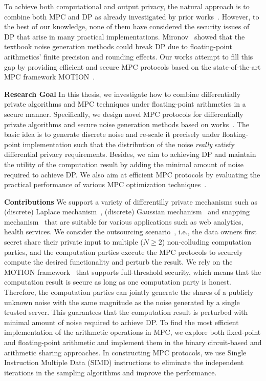 To achieve both computational and output privacy, the natural approach is to combine both MPC and DP as already investigated by prior works~\cite{eigner2014differentially, pettai2015combining, byrd2020differentially}. However, to the best of our knowledge, none of them have considered the security issues of DP that arise in many practical implementations. Mironov~\cite{mironov2012significance} showed that the textbook noise generation methods could break DP due to floating-point arithmetics' finite precision and rounding effects. Our works attempt to fill this gap by providing efficient and secure MPC protocols based on the state-of-the-art MPC framework MOTION~\cite{braun2020motion}.

\textbf{Research Goal}
In this thesis, we investigate how to combine differentially private algorithms and MPC techniques under floating-point arithmetics in a secure manner. Specifically, we design novel MPC protocols for differentially private algorithms and secure noise generation methods based on works~\cite{mironov2012significance,googleDP2019,canonne2020discrete}. The basic idea is to generate discrete noise and re-scale it precisely under floating-point implementation such that the distribution of the noise \textit{really} satisfy differential privacy requirements. Besides, we aim to achieving DP and maintain the utility of the computation result by adding the minimal amount of noise required to achieve DP. We also aim at efficient MPC protocols by evaluating the practical performance of various MPC optimization techniques~\cite{braun2020motion}.

\textbf{Contributions}
We support a variety of differentilly private mechanisms such as (discrete) Laplace mechanism~\cite{chan2012privacy,ghosh2012universally,dwork2014algorithmic}, (discrete) Gaussian mechanism~\cite{dwork2014algorithmic, canonne2020discrete} and snapping mechanism~\cite{mironov2012significance} that are suitable for various applications such as web analytics, health services.
We consider the outsourcing scenario~\cite{kamara2011secure}, i.e., the data owners first secret share their private input to multiple ($N \geq 2$) non-colluding computation parties, and the computation parties execute the MPC protocols to securely compute the desired functionality and perturb the result. We rely on the MOTION framework~\cite{braun2020motion} that supports full-threshold security, which means that the computation result is secure as long as one computation party is honest. Therefore, the computation parties can jointly generate the shares of a publicly unknown noise with the same magnitude as the noise generated by a single trusted server.
This guarantees that the computation result is perturbed with minimal amount of noise required to achieve DP.
To find the most efficient implementation of the arithmetic operations in MPC, we explore both fixed-point and floating-point arithmetic and implement them in the binary circuit-based and arithmetic sharing approaches.
In constructing MPC protocols, we use Single Instruction Multiple Data (SIMD) instructions to eliminate the independent iterations in the sampling algorithms and improve the performance.

